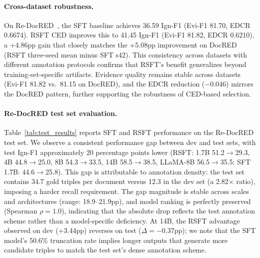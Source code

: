 \paragraph{Cross-dataset robustness.}
On Re-DocRED~\citep{tan2022redocred}, the SFT baseline achieves 36.59 Ign-F1 (Evi-F1 81.70, EDCR 0.6674). RSFT CED improves this to 41.45 Ign-F1 (Evi-F1 81.82, EDCR 0.6210), a +4.86pp gain that closely matches the +5.08pp improvement on DocRED (RSFT three-seed mean minus SFT s42). This consistency across datasets with different annotation protocols confirms that RSFT's benefit generalizes beyond training-set-specific artifacts. Evidence quality remains stable across datasets (Evi-F1 81.82 vs.\ 81.15 on DocRED), and the EDCR reduction ($-0.046$) mirrors the DocRED pattern, further supporting the robustness of CED-based selection.

\paragraph{Re-DocRED test set evaluation.}
Table~\ref{tab:test_results} reports SFT and RSFT performance on the Re-DocRED test set. We observe a consistent performance gap between dev and test sets, with test Ign-F1 approximately 20 percentage points lower (RSFT: 1.7B 51.2$\to$29.3, 4B 44.8$\to$25.0, 8B 54.3$\to$33.5, 14B 58.5$\to$38.5, LLaMA-8B 56.5$\to$35.5; SFT 1.7B: 44.6$\to$25.8). This gap is attributable to annotation density: the test set contains 34.7 gold triples per document versus 12.3 in the dev set (a 2.82$\times$ ratio), imposing a harder recall requirement. The gap magnitude is stable across scales and architectures (range: 18.9--21.9pp), and model ranking is perfectly preserved (Spearman $\rho{=}1.0$), indicating that the absolute drop reflects the test annotation scheme rather than a model-specific deficiency. At 14B, the RSFT advantage observed on dev (+3.44pp) reverses on test ($\Delta{=}{-}0.37$pp); we note that the SFT model's 50.6\% truncation rate implies longer outputs that generate more candidate triples to match the test set's dense annotation scheme.

